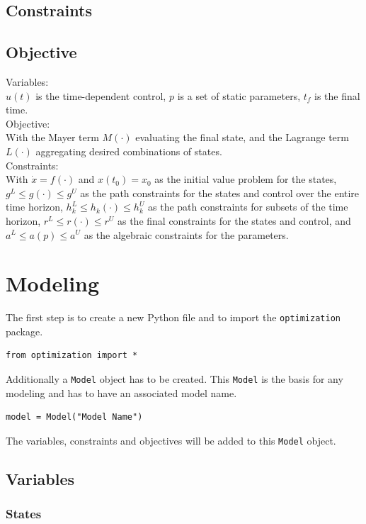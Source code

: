 \documentclass[12pt]{article}
\begin{document}
	\subsection{Constraints}
	
	\subsection{Objective}
	Variables:
	\\
	$u(t)$ is the time-dependent control, $p$ is a set of static parameters, $t_f$ is the final time.
	\\
	Objective:
	\\
	With the Mayer term $M(\cdot)$ evaluating the final state, and the Lagrange term $L(\cdot)$ aggregating desired combinations of states.
	\\
	Constraints:
	\\
	With $\dot{x} = f(\cdot)$ and $x(t_0) = x_0$ as the initial value problem for the states, $g^L \leq g(\cdot) \leq g^U$ as the path constraints for the states and control over the entire time horizon, $h^L_k \leq h_k(\cdot) \leq h^U_k$ as the path constraints for subsets of the time horizon, $r^L \leq r(\cdot) \leq r^U$ as the final constraints for the states and control, and $a^L \leq a(p) \leq a^U$ as the algebraic constraints for the parameters.
	
	\section{Modeling}
	
	The first step is to create a new Python file and to import the \texttt{optimization} package.
	\begin{lstlisting}
from optimization import *
	\end{lstlisting}

	Additionally a \texttt{Model} object has to be created. This \texttt{Model} is the basis for any modeling and has to have an associated model name.
	\begin{lstlisting}
model = Model("Model Name")
	\end{lstlisting}

	The variables, constraints and objectives will be added to this \texttt{Model} object.

	\subsection{Variables} 
	
	\subsubsection{States}
	
\end{document}
